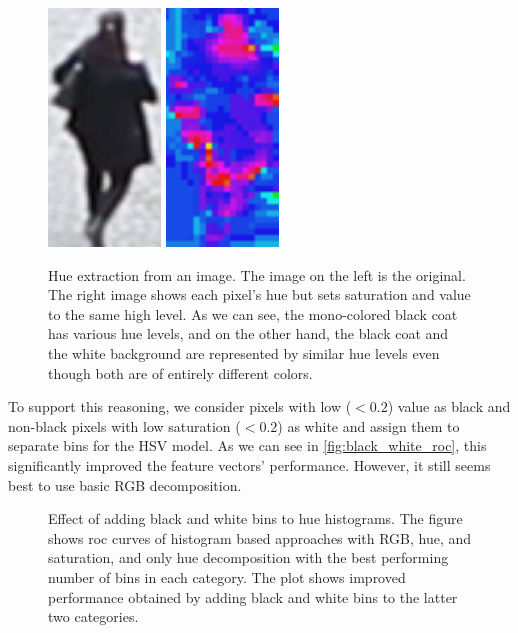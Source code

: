 \begin{figure}
    \centering
    \includegraphics[width=3cm]{img/bad_hue_orig.png}
    \includegraphics[width=3cm]{img/bad_hue_hue.png}
    \caption[Hue extraction from an image]{Hue extraction from an image. The image on the left is the original. The right image shows each pixel's hue but sets saturation and value to the same high level. As we can see, the mono-colored black coat has various hue levels, and on the other hand, the black coat and the white background are represented by similar hue levels even though both are of entirely different colors.}
    \label{fig:bad_hue}
\end{figure}

To support this reasoning, we consider pixels with low ($< 0.2$)
value as black and non-black pixels with low saturation ($< 0.2$) as white and
assign them to separate bins for the HSV model. As we can see in \autoref{fig:black_white_roc}, this
significantly improved the feature vectors' performance. However, it still seems best to use basic RGB decomposition.

\begin{figure}
    \centering
    \def\svgwidth{\columnwidth}
    
    \caption[Effect of adding black and white bins to the hue histograms]{Effect of adding black and white bins to hue histograms. The figure shows \gls{roc} curves of histogram based approaches with RGB, hue, and saturation, and only hue decomposition with the best performing number of bins in each category. The plot shows improved performance obtained by adding black and white bins to the latter two categories.}
    \label{fig:black_white_roc}
\end{figure}

